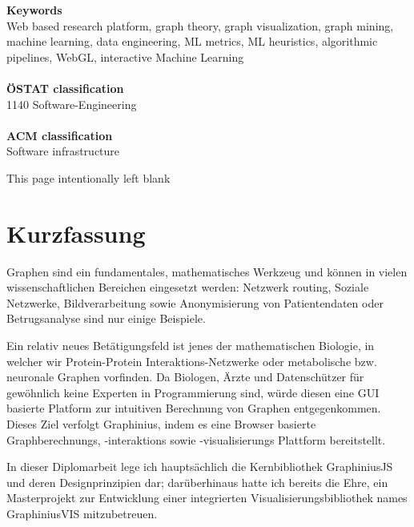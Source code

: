 {%

\vfill
\noindent
\textbf{Keywords}\\
Web based research platform, graph theory, graph visualization, graph mining, machine learning, data engineering, ML metrics, ML heuristics, algorithmic pipelines, WebGL, interactive Machine Learning \\
\\
\textbf{ÖSTAT classification}\\
1140 Software-Engineering\\
\\
\textbf{ACM classification}\\
Software infrastructure

\clearpage
\begin{center}
This page intentionally left blank
\end{center}
\clearpage



\section*{Kurzfassung}

Graphen sind ein fundamentales, mathematisches Werkzeug und können in vielen wissenschaftlichen Bereichen eingesetzt werden: Netzwerk routing, Soziale Netzwerke, Bildverarbeitung sowie Anonymisierung von Patientendaten oder Betrugsanalyse sind nur einige Beispiele.

Ein relativ neues Betätigungsfeld ist jenes der mathematischen Biologie, in welcher wir Protein-Protein Interaktions-Netzwerke oder metabolische bzw. neuronale Graphen vorfinden. Da Biologen, Ärzte und Datenschützer für gewöhnlich keine Experten in Programmierung sind, würde diesen eine GUI basierte Platform zur intuitiven Berechnung von Graphen entgegenkommen. Dieses Ziel verfolgt Graphinius, indem es eine Browser basierte Graphberechnungs, -interaktions sowie -visualisierungs Plattform bereitstellt.

In dieser Diplomarbeit lege ich hauptsächlich die Kernbibliothek GraphiniusJS und deren Designprinzipien dar; darüberhinaus hatte ich bereits die Ehre, ein Masterprojekt zur Entwicklung einer integrierten Visualisierungsbibliothek names GraphiniusVIS mitzubetreuen.

}

